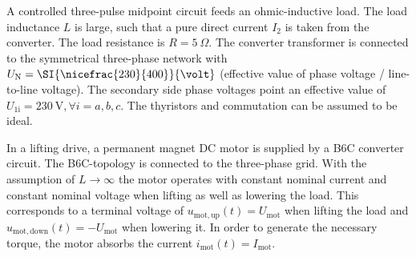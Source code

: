 

A controlled three-pulse midpoint circuit feeds an ohmic-inductive load. The load inductance $L$ is large, such that a pure direct current $I_\mathrm{2}$ is taken from the converter. The load resistance is $R = \SI{5}{\Omega}$. The converter transformer 
is connected to the symmetrical three-phase network with $U_\mathrm{N} = \SI{\nicefrac{230}{400}}{\volt} $ (effective value of phase voltage / line-to-line voltage). The secondary side phase voltages point an effective value of 
$U_\mathrm{1i} = \SI{230}{\volt}, \forall i=a,b,c$. The thyristors and commutation can be assumed to be ideal.






In a lifting drive, a permanent magnet DC motor is supplied by a B6C converter circuit. The B6C-topology is connected to the three-phase grid.
With the assumption of $L\rightarrow\infty$ the motor operates with constant nominal current and constant nominal voltage when lifting as well as lowering the load.
This corresponds to a terminal voltage of $u_\mathrm{mot,up}(t)=U_\mathrm{mot}$ when lifting the load and $u_\mathrm{mot,down}(t)=-U_\mathrm{mot}$ when lowering it.
In order to generate the necessary torque, the motor absorbs the current $i_\mathrm{mot}(t)=I_\mathrm{mot}$.

